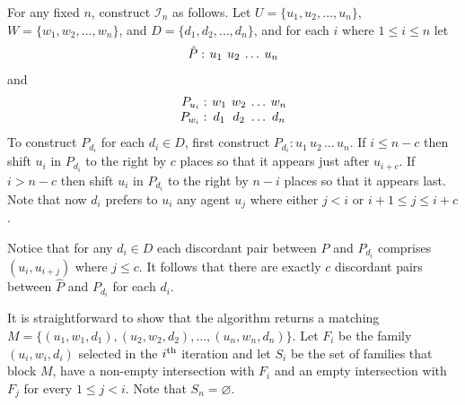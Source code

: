 For any fixed $n$, construct $\mathcal{I}_n$ as follows. Let $U = \{ u_1, u_2, \dots, u_n \}$, $W =  \{ w_1, w_2, \dots, w_n \}$, and $D = \{ d_1, d_2, \dots, d_n \}$, and for each $i$ where $1\leq i \leq n$ let
\begin{align*}
\setlength\arraycolsep{2pt}
\begin{array}{r c c c c}
\hat{P} :& u_1 & u_2 & \dots & u_n
\end{array}
\end{align*}
and
\begin{align*}
\setlength\arraycolsep{2pt}
\begin{array}{r c c c c}
P_{u_i} :& w_1 & w_2 & \dots & w_{n}\\
P_{w_i} :& d_1 & d_2 & \dots & d_{n}
\end{array}
\end{align*}
To construct $P_{d_i}$ for each $d_i \in D$, first construct $P_{d_i} : u_1\hspace{2pt} u_2\hspace{2pt} \dots\hspace{2pt} u_n$. If $i \leq n - c$ then shift $u_i$ in $P_{d_i}$ to the right by $c$ places so that it appears just after $u_{i+c}$. If $i > n - c$ then shift $u_i$ in $P_{d_i}$ to the right by $n - i$ places so that it appears last. Note that now $d_i$ prefers to $u_i$ any agent $u_j$ where either $j < i$ or $i + 1 \leq j \leq i + c$.

Notice that for any $d_i \in D$ each discordant pair between $\hat{P}$ and $P_{d_i}$ comprises $(u_i, u_{i + j})$ where $j \leq c$. It follows that there are exactly $c$ discordant pairs between $\hat{P}$ and $P_{d_i}$ for each $d_i$.

It is straightforward to show that the algorithm returns a matching $M = \{ (u_1, w_1, d_1), (u_2, w_2, d_2), \dots, (u_n, w_n, d_n) \}$. Let $F_i$ be the family $( u_i, w_i, d_i )$ selected in the $i\textsuperscript{th}$ iteration and let $S_i$ be the set of families that block $M$, have a non-empty intersection with $F_i$ and an empty intersection with $F_j$ for every $1\leq j < i$. Note that $S_n = \varnothing$. 

